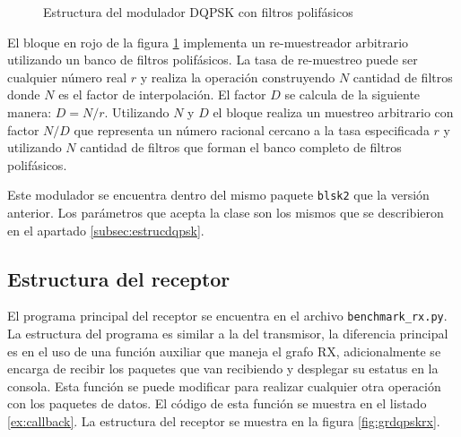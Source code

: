 \begin{figure}[htp]
  \centering
  \vspace{0.5in}
  \vspace{0.3in}
  \caption{Estructura del modulador DQPSK con filtros polif\'asicos}
  \label{fig:dqpsk2}
\end{figure}

El bloque en rojo de la figura \ref{fig:dqpsk2} implementa un re-muestreador arbitrario utilizando un banco de filtros
polif\'asicos. La tasa de re-muestreo puede ser cualquier n\'umero real $r$ y realiza la operaci\'on construyendo $N$
cantidad de filtros donde $N$ es el factor de interpolaci\'on. El factor $D$ se calcula de la siguiente manera: $D=N/r$.
Utilizando $N$ y $D$ el bloque realiza un muestreo arbitrario con factor $N/D$ que representa un n\'umero racional cercano a
la tasa especificada $r$ y utilizando $N$ cantidad de filtros que forman el banco completo de filtros polif\'asicos.

Este modulador se encuentra dentro del mismo paquete \verb|blsk2| que la versi\'on anterior. Los par\'ametros que acepta la
clase son los mismos que se describieron en el apartado \ref{subsec:estrucdqpsk}.

\subsection{Estructura del receptor}
El programa principal del receptor se encuentra en el archivo \verb|benchmark_rx.py|. La estructura del programa es
similar a la del transmisor, la diferencia principal es en el uso de una funci\'on auxiliar que maneja el grafo RX, adicionalmente
se encarga de recibir los paquetes que van recibiendo y desplegar su estatus en la consola. Esta funci\'on se puede modificar
para realizar cualquier otra operaci\'on con los paquetes de datos. El c\'odigo de esta funci\'on se muestra en el listado
\ref{ex:callback}. La estructura del receptor se muestra en la figura \ref{fig:grdqpskrx}.

